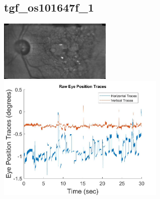 \documentclass[11pt]{article}
\begin{document}
\subsection{tgf\_os101647f\_1}
\includegraphics[width=0.40\textwidth, valign=m]{referenceframes/rodenstock_amd/tgf_os101647f_1_dwt_nostim_gamscaled_bandfilt_refframe.jpg}
\includegraphics[width=0.60\textwidth, valign=m]{eyepositiontraces/rodenstock_amd/tgf_os101647f_1.jpg}\\
\end{document}
